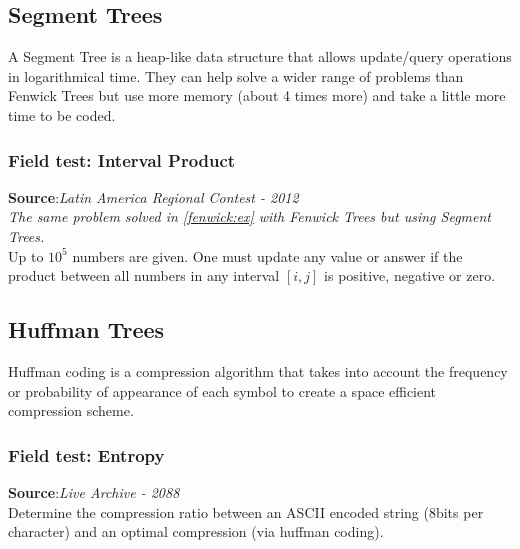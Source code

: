 \documentclass[11pt, oneside]{article}   	%
\begin{document}

\subsection{Segment Trees}
A Segment Tree is a heap-like data structure that allows update/query operations in logarithmical time. They can help solve a wider range of problems than Fenwick Trees but use more memory (about 4 times more) and take a little more time to be coded.


\subsubsection{Field test: Interval Product }
\textbf{Source}:\textit{Latin America Regional Contest - 2012}\\
\textit{The same problem solved in \ref{fenwick:ex} with Fenwick Trees but using Segment Trees.}\\
Up to $10^5$ numbers are given. One must update any value or answer if the product between all numbers in any interval $[i,j]$ is positive, negative or zero.


\subsection{Huffman Trees}
Huffman coding is a compression algorithm that takes into account the frequency or probability of appearance of each symbol to create a space efficient compression scheme.
\subsubsection{Field test: Entropy }
\textbf{Source}:\textit{Live Archive - 2088}\\
Determine the compression ratio between an ASCII encoded string (8bits per character) and an optimal compression (via huffman coding).
\end{document}
